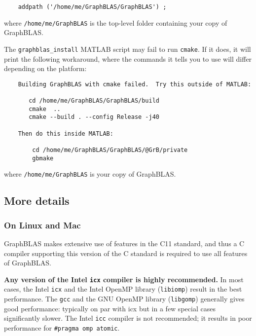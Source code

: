 \documentclass[12pt]{article}
\begin{document}
    {\small
    \begin{verbatim}
    addpath ('/home/me/GraphBLAS/GraphBLAS') ; \end{verbatim} }

\noindent
where \verb'/home/me/GraphBLAS' is the top-level folder containing your
copy of GraphBLAS.

The \verb'graphblas_install' MATLAB script may fail to run \verb'cmake'.
If it does, it will print the following workaround, where the commands it
tells you to use will differ depending on the platform:

    {\small
    \begin{verbatim}
    Building GraphBLAS with cmake failed.  Try this outside of MATLAB:

       cd /home/me/GraphBLAS/GraphBLAS/build
       cmake  ..
       cmake --build . --config Release -j40

    Then do this inside MATLAB:

        cd /home/me/GraphBLAS/GraphBLAS/@GrB/private
        gbmake \end{verbatim} }

\noindent
where \verb'/home/me/GraphBLAS' is your copy of GraphBLAS.

\subsection{More details}

\subsubsection{On Linux and Mac}

GraphBLAS makes extensive use of features in the C11 standard, and thus a
C compiler supporting this version of the C standard is required to use
all features of GraphBLAS.

{\bf Any version of the Intel \verb'icx' compiler is highly recommended.} In
most cases, the Intel \verb'icx' and the Intel OpenMP library (\verb'libiomp')
result in the best performance.  The \verb'gcc' and the GNU OpenMP library
(\verb'libgomp') generally gives good performance: typically on par with icx
but in a few special cases significantly slower.  The Intel \verb'icc' compiler
is not recommended; it results in poor performance for
\verb'#pragma omp atomic'.
\end{document}
